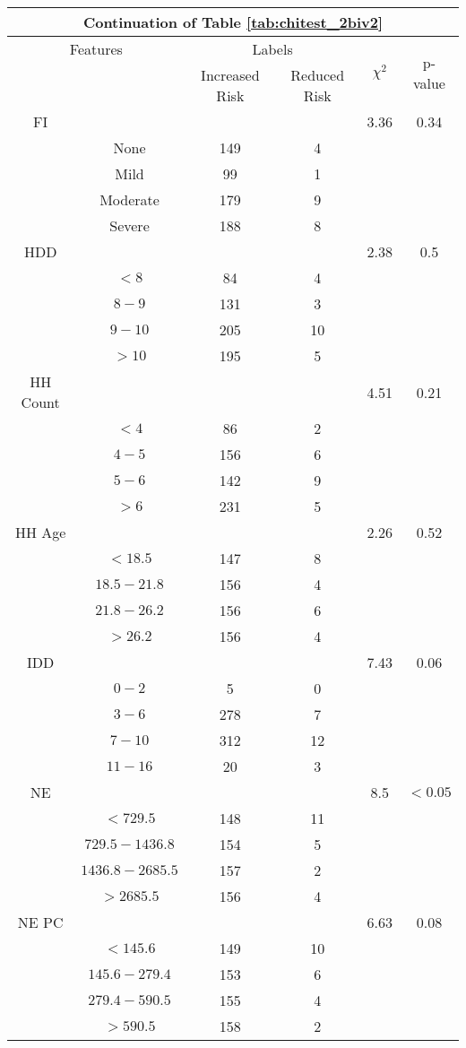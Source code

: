 \begin{table}
\centering
\label{tab:chitest_2biv2_cont}
\begin{tabular}{c c | c c| c | c}
\hline
\multicolumn{6}{c}{Continuation of Table \ref{tab:chitest_2biv2}}\\ 
\hline
\multicolumn{2}{c|}{Features}& \multicolumn{2}{c|}{Labels}& \multirow{2}{*}{$\chi^2$} & \multirow{2}{*}{p-value}\\ 
& & Increased Risk & Reduced Risk & & \\ 
\hline
FI &  &  & & 3.36 & 0.34 \\ 
& None & 149 & 4& & \\ 
& Mild & 99 & 1& & \\ 
& Moderate & 179 & 9& & \\ 
& Severe & 188 & 8& & \\ 
\hline 
HDD &  &  & & 2.38 & 0.5 \\ 
& $< 8$ & 84 & 4& & \\ 
& $8-9$ & 131 & 3& & \\ 
& $9-10$ & 205 & 10& & \\ 
& $> 10$ & 195 & 5& & \\ 
\hline 
HH Count &  &  & & 4.51 & 0.21 \\ 
& $< 4$ & 86 & 2& & \\ 
& $4-5$ & 156 & 6& & \\ 
& $5-6$ & 142 & 9& & \\ 
& $> 6$ & 231 & 5& & \\ 
\hline 
HH Age &  &  & & 2.26 & 0.52 \\ 
& $< 18.5$ & 147 & 8& & \\ 
& $18.5-21.8$ & 156 & 4& & \\ 
& $21.8-26.2$ & 156 & 6& & \\ 
& $> 26.2$ & 156 & 4& & \\ 
\hline 
IDD &  &  & & 7.43 & 0.06 \\ 
& $0-2$ & 5 & 0& & \\ 
& $3-6$ & 278 & 7& & \\ 
& $7-10$ & 312 & 12& & \\ 
& $11-16$ & 20 & 3& & \\ 
\hline 
NE &  &  & & 8.5 & $< 0.05$ \\ 
& $< 729.5$ & 148 & 11& & \\ 
& $729.5-1436.8$ & 154 & 5& & \\ 
& $1436.8-2685.5$ & 157 & 2& & \\ 
& $> 2685.5$ & 156 & 4& & \\ 
\hline 
NE PC &  &  & & 6.63 & 0.08 \\ 
& $< 145.6$ & 149 & 10& & \\ 
& $145.6-279.4$ & 153 & 6& & \\ 
& $279.4-590.5$ & 155 & 4& & \\ 
& $> 590.5$ & 158 & 2& & \\ 
\hline 
\end{tabular}
\end{table}

